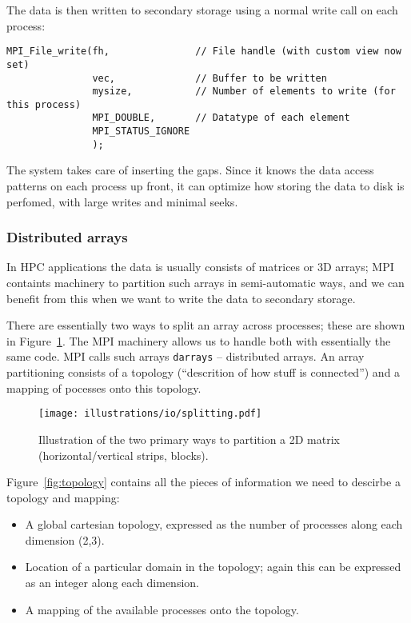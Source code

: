 The data is then written to secondary storage using a normal write call on each process:
\begin{lstlisting}
MPI_File_write(fh,               // File handle (with custom view now set)
               vec,              // Buffer to be written
               mysize,           // Number of elements to write (for this process)
               MPI_DOUBLE,       // Datatype of each element
               MPI_STATUS_IGNORE
               );
\end{lstlisting}

The system takes care of inserting the gaps. Since it knows the data access patterns on each process up front, it can optimize how storing the data to disk is perfomed, with large writes and minimal seeks.

\subsubsection{Distributed arrays} %
\label{ssub:distributed_arrays}
In HPC applications the data is usually consists of matrices or 3D arrays; MPI containts machinery to partition such arrays in semi-automatic ways, and we can benefit from this when we want to write the data to secondary storage.

There are essentially two ways to split an array across processes; these are shown in Figure~\ref{fig:splitting}. The MPI machinery allows us to handle both with essentially the same code. MPI calls such arrays \texttt{darrays} -- distributed arrays. An array partitioning consists of a topology (``descrition of how stuff is connected'') and a mapping of pocesses onto this topology.

\begin{figure}[htbp]
  \centering
  \texttt{[image: illustrations/io/splitting.pdf]}
  \caption{Illustration of the two primary ways to partition a 2D matrix (horizontal/vertical strips, blocks).}
  \label{fig:splitting}
\end{figure}

Figure~\ref{fig:topology} contains all the pieces of information we need to descirbe a topology and mapping:
\begin{itemize}
  \item A global cartesian topology, expressed as the number of processes along each dimension (2,3).
  \item Location of a particular domain in the topology; again this can be expressed as an integer along each dimension.
  \item A mapping of the available processes onto the topology.
\end{itemize}

